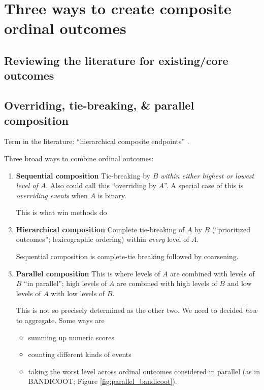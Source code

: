 \documentclass[
  11pt,
  fleqn
]{article}
\begin{document}
\section{Three ways to create composite ordinal outcomes}

\subsection{Reviewing the literature for existing/core outcomes}

\subsection{Overriding, tie-breaking, \& parallel composition}

Term in the literature: ``hierarchical composite endpoints''
\citep{gasparyanDesignAnalysisStudies2022}.

Three broad ways to combine ordinal outcomes:
\begin{enumerate}
  \item \textbf{Sequential composition} Tie-breaking by $B$
    \emph{within either highest or lowest level of $A$}. Also could
    call this ``overriding by $A$''. A special case of this is
    \emph{overriding events} when $A$ is binary.

    This is what win methods do 
  \item \textbf{Hierarchical composition} Complete tie-breaking of $A$ by
    $B$ (``prioritized outcomes''; lexicographic ordering) within
    \emph{every} level of $A$.

    Sequential composition is complete-tie breaking followed by coarsening.

  \item \textbf{Parallel composition} This is where levels of $A$ are
    combined with levels of $B$ ``in parallel''; high levels of $A$
    are combined with high levels of $B$ and low levels of $A$ with
    low levels of $B$.

    This is not so precisely determined as the other two. We need to
    decided \emph{how} to aggregate. Some ways are
    \begin{itemize}
      \item summing up numeric
        scores
      \item counting different kinds of events
      \item taking the worst level across ordinal outcomes considered
        in parallel (as in BANDICOOT; Figure \ref{fig:parallel_bandicoot}).
    \end{itemize}
\end{enumerate}
\end{document}
